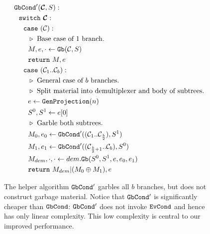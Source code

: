 \begin{figure}
  \begin{align*}
    &\gbcond'(\vec{\cir}, S):\\
    &~~\switch~\vec{\cir}:\\
    &~~~~\ccase~(\cir):\\
    &~~~~~~\codecomment{Base case of $1$ branch.}\\
    &~~~~~~M, e, \cdot \gets \gb(\cir, S)\\
    &~~~~~~\creturn~M, e\\
    &~~~~\ccase~(\cir_1..\cir_b):\\
    &~~~~~~\codecomment{General case of $b$ branches.}\\
    &~~~~~~\codecomment{Split material into demultiplexer and body of subtrees.}\\
    &~~~~~~e \gets \genprojection(n)\\
    &~~~~~~S^0, S^1 \gets e[0]\\
    &~~~~~~\codecomment{Garble both subtrees.}\\
    &~~~~~~M_0,e_0 \gets \gbcond'((\cir_1..\cir_{\frac{b}{2}}), S^1)\\
    &~~~~~~M_1,e_1 \gets \gbcond'((\cir_{\frac{b}{2}+1}..\cir_b), S^0)\\
    &~~~~~~M_{dem},\cdot, \cdot \gets dem.\gb(S^0, S^1, e, e_0, e_1)\\
    &~~~~~~\creturn~M_{dem}|(M_0\oplus M_1), e
  \end{align*}
  \caption{%
    The helper algorithm $\mathtt{GbCond}'$ garbles all $b$ branches, but does
    not construct garbage material.
    Notice that $\mathtt{GbCond}'$ is significantly cheaper than $\mathtt{GbCond}$:
    $\mathtt{GbCond}'$ does not invoke $\mathtt{EvCond}$ and hence has only linear
    complexity.
    This low complexity is central to our improved performance.
  }
\end{figure}
